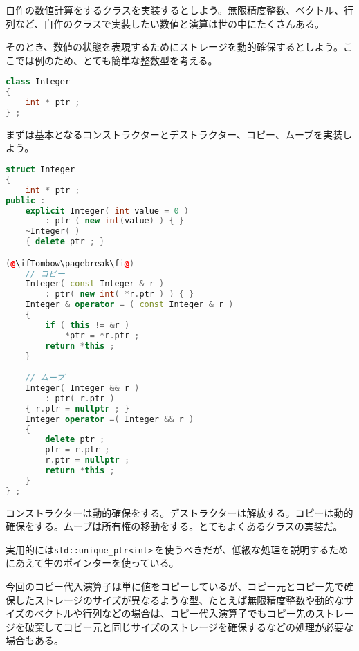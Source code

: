 
自作の数値計算をするクラスを実装するとしよう。無限精度整数、ベクトル、行列など、自作のクラスで実装したい数値と演算は世の中にたくさんある。

そのとき、数値の状態を表現するためにストレージを動的確保するとしよう。ここでは例のため、とても簡単な整数型を考える。

\begin{lstlisting}[language={C++}]
class Integer
{
    int * ptr ;
} ;
\end{lstlisting}


まずは基本となるコンストラクターとデストラクター、コピー、ムーブを実装しよう。

\begin{lstlisting}[language={C++}]
struct Integer
{
    int * ptr ;
public :
    explicit Integer( int value = 0 )
        : ptr ( new int(value) ) { }
    ~Integer( )
    { delete ptr ; } 

(@\ifTombow\pagebreak\fi@)
    // コピー
    Integer( const Integer & r )
        : ptr( new int( *r.ptr ) ) { }
    Integer & operator = ( const Integer & r )
    {
        if ( this != &r )
            *ptr = *r.ptr ;
        return *this ;
    }

    // ムーブ
    Integer( Integer && r )
        : ptr( r.ptr )
    { r.ptr = nullptr ; }
    Integer operator =( Integer && r )
    {
        delete ptr ;
        ptr = r.ptr ;
        r.ptr = nullptr ;
        return *this ;
    }
} ;
\end{lstlisting}

コンストラクターは動的確保をする。デストラクターは解放する。コピーは動的確保をする。ムーブは所有権の移動をする。とてもよくあるクラスの実装だ。

実用的には\texttt{std::unique\_ptr<int>}\,を使うべきだが、低級な処理を説明するためにあえて生のポインターを使っている。

今回のコピー代入演算子は単に値をコピーしているが、コピー元とコピー先で確保したストレージのサイズが異なるような型、たとえば無限精度整数や動的なサイズのベクトルや行列などの場合は、コピー代入演算子でもコピー先のストレージを破棄してコピー元と同じサイズのストレージを確保するなどの処理が必要な場合もある。

